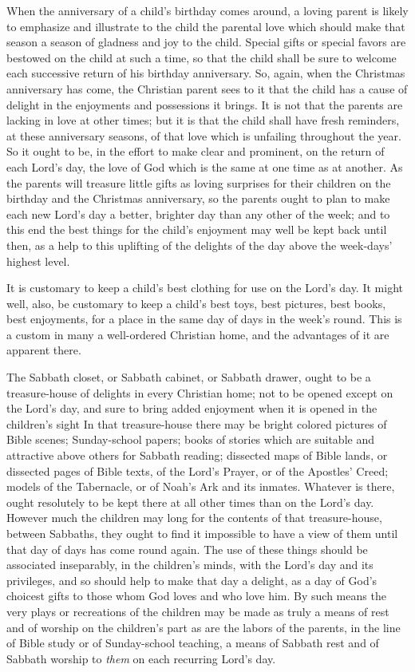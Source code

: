 \documentclass[
]{book}
\begin{document}
When the anniversary of a child's birthday comes around, a loving parent is likely to emphasize and illustrate to the child the parental love which should make that season a season of gladness and joy to the child. Special gifts or special favors are bestowed on the child at such a time, so that the child shall be sure to welcome each successive return of his birthday anniversary. So, again, when the Christmas anniversary has come, the Christian parent sees to it that the child has a cause of delight in the enjoyments and possessions it brings. It is not that the parents are lacking in love at other times; but it is that the child shall have fresh reminders, at these anniversary seasons, of that love which is unfailing throughout the year. So it ought to be, in the effort to make clear and prominent, on the return of each Lord's day, the love of God which is the same at one time as at another. As the parents will treasure little gifts as loving surprises for their children on the birthday and the Christmas anniversary, so the parents ought to plan to make each new Lord's day a better, brighter day than any other of the week; and to this end the best things for the child's enjoyment may well be kept back until then, as a help to this uplifting of the delights of the day above the week-days' highest level.

It is customary to keep a child's best clothing for use on the Lord's day. It might well, also, be customary to keep a child's best toys, best pictures, best books, best enjoyments, for a place in the same day of days in the week's round. This is a custom in many a well-ordered Christian home, and the advantages of it are apparent there.

The Sabbath closet, or Sabbath cabinet, or Sabbath drawer, ought to be a treasure-house of delights in every Christian home; not to be opened except on the Lord's day, and sure to bring added enjoyment when it is opened in the children's sight In that treasure-house there may be bright colored pictures of Bible scenes; Sunday-school papers; books of stories which are suitable and attractive above others for Sabbath reading; dissected maps of Bible lands, or dissected pages of Bible texts, of the Lord's Prayer, or of the Apostles' Creed; models of the Tabernacle, or of Noah's Ark and its inmates. Whatever is there, ought resolutely to be kept there at all other times than on the Lord's day. However much the children may long for the contents of that treasure-house, between Sabbaths, they ought to find it impossible to have a view of them until that day of days has come round again. The use of these things should be associated inseparably, in the children's minds, with the Lord's day and its privileges, and so should help to make that day a delight, as a day of God's choicest gifts to those whom God loves and who love him. By such means the very plays or recreations of the children may be made as truly a means of rest and of worship on the children's part as are the labors of the parents, in the line of Bible study or of Sunday-school teaching, a means of Sabbath rest and of Sabbath worship to \emph{them} on each recurring Lord's day.
\end{document}
